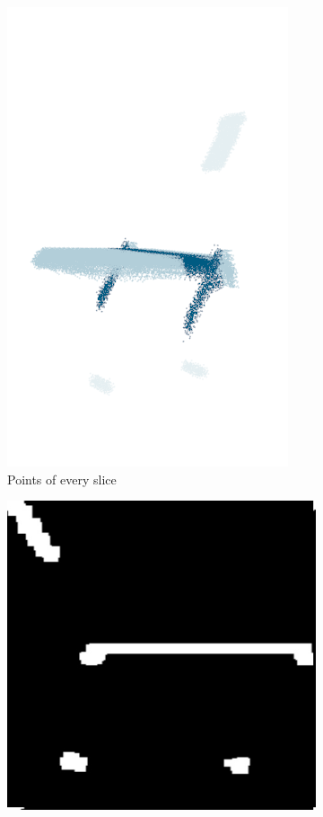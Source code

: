 \begin{figure}[!t]
	\begin{subfigure}[t]{0.3\linewidth}
		\centering
		\includegraphics[width=1\linewidth]{Figures/ObjRecog/slices/chairn_2}
        \caption{Points of every slice}
        \label{fig:slicing_b}
	\end{subfigure}
    \begin{subfigure}[t]{0.8\linewidth}
		\centering
        \vspace{1em}
		\includegraphics[height=0.32\linewidth]{Figures/ObjRecog/slices/chair_slice31}

\end{subfigure}
\end{figure}

